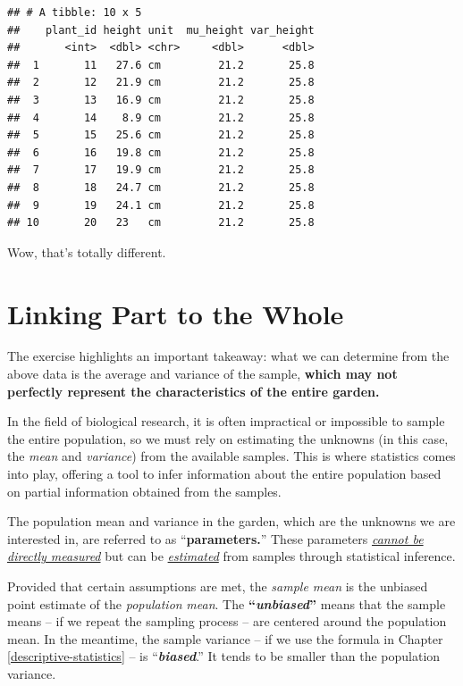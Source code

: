 \documentclass[
]{book}
\begin{document}
\begin{verbatim}
## # A tibble: 10 x 5
##    plant_id height unit  mu_height var_height
##       <int>  <dbl> <chr>     <dbl>      <dbl>
##  1       11   27.6 cm         21.2       25.8
##  2       12   21.9 cm         21.2       25.8
##  3       13   16.9 cm         21.2       25.8
##  4       14    8.9 cm         21.2       25.8
##  5       15   25.6 cm         21.2       25.8
##  6       16   19.8 cm         21.2       25.8
##  7       17   19.9 cm         21.2       25.8
##  8       18   24.7 cm         21.2       25.8
##  9       19   24.1 cm         21.2       25.8
## 10       20   23   cm         21.2       25.8
\end{verbatim}

Wow, that's totally different.

\hypertarget{linking-part-to-the-whole}{%
\section{Linking Part to the Whole}\label{linking-part-to-the-whole}}

The exercise highlights an important takeaway: what we can determine from the above data is the average and variance of the sample, \textbf{which may not perfectly represent the characteristics of the entire garden.}

In the field of biological research, it is often impractical or impossible to sample the entire population, so we must rely on estimating the unknowns (in this case, the \emph{mean} and \emph{variance}) from the available samples. This is where statistics comes into play, offering a tool to infer information about the entire population based on partial information obtained from the samples.

The population mean and variance in the garden, which are the unknowns we are interested in, are referred to as ``\textbf{parameters.}'' These parameters \uline{\emph{cannot be directly measured}} but can be \uline{\emph{estimated}} from samples through statistical inference.

Provided that certain assumptions are met, the \emph{sample mean} is the unbiased point estimate of the \emph{population} \emph{mean}. The \textbf{``\emph{unbiased}''} means that the sample means -- if we repeat the sampling process -- are centered around the population mean. In the meantime, the sample variance -- if we use the formula in Chapter \ref{descriptive-statistics} -- is ``\textbf{\emph{biased}}.'' It tends to be smaller than the population variance.
\end{document}

